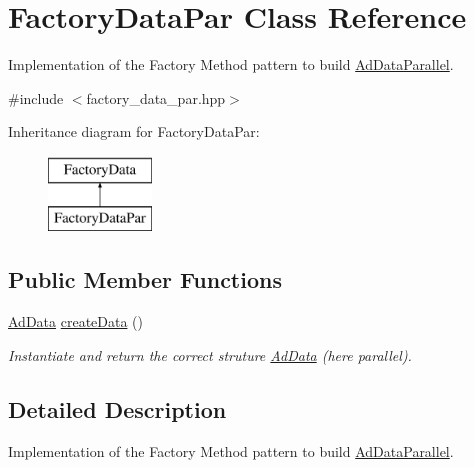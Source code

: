 \hypertarget{classFactoryDataPar}{\section{\-Factory\-Data\-Par \-Class \-Reference}
\label{classFactoryDataPar}
}


\-Implementation of the \-Factory \-Method pattern to build \hyperlink{classAdDataParallel}{\-Ad\-Data\-Parallel}.  




{\ttfamily \#include $<$factory\-\_\-data\-\_\-par.\-hpp$>$}

\-Inheritance diagram for \-Factory\-Data\-Par\-:\begin{figure}[H]
\begin{center}
\leavevmode
\includegraphics[height=2.000000cm]{classFactoryDataPar}
\end{center}
\end{figure}
\subsection*{\-Public \-Member \-Functions}
\begin{DoxyCompactItemize}
\item 
\hyperlink{classAdData}{\-Ad\-Data} \hyperlink{classFactoryDataPar_a90e41820a2c94e76c947f4a4ee7809fb}{create\-Data} ()
\begin{DoxyCompactList}\small\item\em \-Instantiate and return the correct struture \hyperlink{classAdData}{\-Ad\-Data} (here parallel). \end{DoxyCompactList}\end{DoxyCompactItemize}


\subsection{\-Detailed \-Description}
\-Implementation of the \-Factory \-Method pattern to build \hyperlink{classAdDataParallel}{\-Ad\-Data\-Parallel}. 

